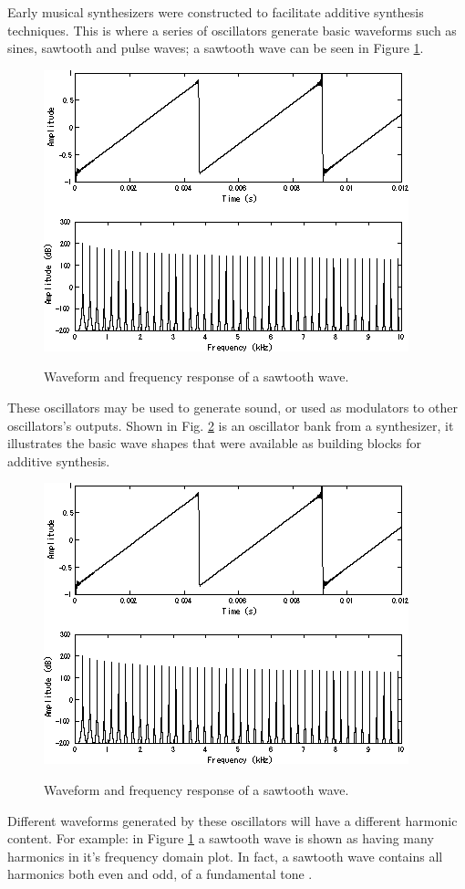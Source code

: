 \documentclass{article}
\begin{document}
        Early musical synthesizers were constructed to facilitate additive synthesis techniques.
        This is where a series of oscillators generate basic waveforms such as sines, sawtooth and pulse waves; a sawtooth wave can be seen in Figure \ref{sawtooth}.
        \begin{figure}[H]
            \includegraphics[scale=0.6]{images/Sawtooth.png}%
            \centering
            \caption{Waveform and frequency response of a sawtooth wave.}\cite{kraft2017lp}
            \label{sawtooth}
        \end{figure}
        
        These oscillators may be used to generate sound, or used as modulators to other oscillators's outputs.
        Shown in Fig. \ref{oscBank} is an oscillator bank from a synthesizer, it illustrates the basic wave shapes that were available as building blocks for additive synthesis.
        \begin{figure}[H]
            \includegraphics[scale=0.6]{images/Sawtooth.png}%
            \centering
            \caption{Waveform and frequency response of a sawtooth wave.}\cite{kraft2017lp}
            \label{oscBank}
        \end{figure}
        Different waveforms generated by these oscillators will have a different harmonic content.
        For example: in Figure \ref{sawtooth} a sawtooth wave is shown as having many harmonics in it's frequency domain plot.
        In fact, a sawtooth wave contains all harmonics both even and odd, of a fundamental tone \cite{roederer1995physics}.
        
\end{document}
